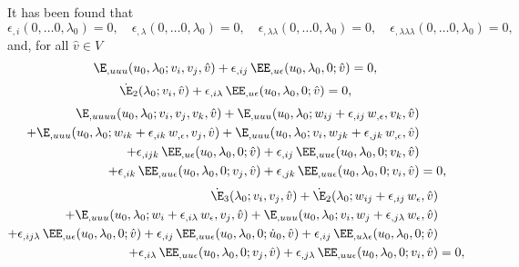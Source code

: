 It has been found that
\begin{equation}
  \epsilon_{,i}(0, \ldots 0, \lambda_0) = 0, \quad  \epsilon_{,\lambda}(0, \ldots 0, \lambda_0) = 0, \quad \epsilon_{,\lambda\lambda}(0, \ldots 0, \lambda_0) = 0, \quad \epsilon_{,\lambda\lambda\lambda}(0, \ldots 0, \lambda_0) = 0,
\end{equation}
and, for all \(\hat{v} \in V\)
\begin{equation}
  \label{eq:20221116151527}
  \E_{,uuu}(u_0, \lambda_0; v_i, v_j, \hat{v}) + \epsilon_{,ij} \, \EE_{,u\epsilon}(u_0, \lambda_0, 0; \hat{v}) = 0,\\
\end{equation}
\begin{equation}
  \label{eq:20221116151638}
  \dot{\E}_2(\lambda_0; v_i, \hat{v}) + \epsilon_{,i\lambda} \, \EE_{,u\epsilon}(u_0, \lambda_0, 0; \hat{v}) = 0,\\
\end{equation}
\begin{equation}
  \label{eq:20221116152151}
  \begin{aligned}[b]
    \E_{,uuuu}(u_0, \lambda_0; v_i, v_j, v_k, \hat{v}) + \E_{,uuu}(u_0, \lambda_0; w_{ij} + \epsilon_{,ij} \, w_{,\epsilon},  v_k, \hat{v})&\\
    + \E_{,uuu}(u_0, \lambda_0; w_{ik} + \epsilon_{,ik} \,  w_{,\epsilon}, v_j, \hat{v}) + \E_{,uuu}(u_0, \lambda_0; v_i, w_{jk} + \epsilon_{,jk} \,  w_{,\epsilon}, \hat{v})&\\
    + \epsilon_{,ijk} \, \EE_{,u\epsilon}(u_0, \lambda_0, 0; \hat{v}) + \epsilon_{,ij} \, \EE_{,uu\epsilon}(u_0, \lambda_0, 0; v_k, \hat{v}) &\\
    + \epsilon_{,ik} \, \EE_{,uu\epsilon}(u_0, \lambda_0, 0; v_j, \hat{v}) + \epsilon_{,jk} \, \EE_{,uu\epsilon}(u_0, \lambda_0, 0; v_i, \hat{v}) &= 0,
  \end{aligned}
\end{equation}
\begin{equation}
  \label{eq:20221116152457}
  \begin{aligned}[b]
    \dot{\E}_3(\lambda_0; v_i, v_j, \hat{v}) + \dot{\E}_2(\lambda_0; w_{ij} + \epsilon_{,ij} \, w_\epsilon, \hat{v}) &\\
    + \E_{,uuu}(u_0, \lambda_0; w_i + \epsilon_{,i\lambda} \,  w_\epsilon, v_j, \hat{v}) + \E_{,uuu}(u_0, \lambda_0; v_i, w_j + \epsilon_{,j\lambda} \,  w_\epsilon, \hat{v}) &\\
    + \epsilon_{,ij\lambda} \, \EE_{,u\epsilon}(u_0, \lambda_0, 0; \hat{v}) + \epsilon_{,ij} \, \EE_{,uu\epsilon}(u_0, \lambda_0, 0; \dot{u}_0, \hat{v}) + \epsilon_{,ij} \, \EE_{,u\lambda\epsilon}(u_0, \lambda_0, 0; \hat{v}) &\\
    + \epsilon_{,i\lambda} \, \EE_{,uu\epsilon}(u_0, \lambda_0, 0; v_j, \hat{v}) + \epsilon_{,j\lambda} \, \EE_{,uu\epsilon}(u_0, \lambda_0, 0; v_i, \hat{v}) &= 0,
  \end{aligned}
\end{equation}
